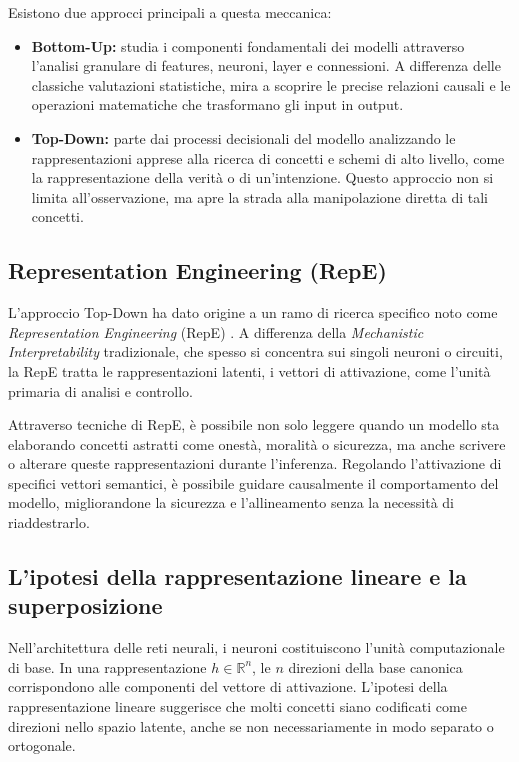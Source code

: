 Esistono due approcci principali a questa meccanica:
\begin{itemize}
    \item \textbf{Bottom-Up:} studia i componenti fondamentali dei modelli attraverso l'analisi granulare di features, neuroni, layer e connessioni. A differenza delle classiche valutazioni statistiche, mira a scoprire le precise relazioni causali e le operazioni matematiche che trasformano gli input in output.

    \item \textbf{Top-Down:} parte dai processi decisionali del modello analizzando le rappresentazioni apprese alla ricerca di concetti e schemi di alto livello, come la rappresentazione della verità o di un'intenzione. Questo approccio non si limita all'osservazione, ma apre la strada alla manipolazione diretta di tali concetti.
\end{itemize}

\subsection{Representation Engineering (RepE)}
L'approccio Top-Down ha dato origine a un ramo di ricerca specifico noto come \textit{Representation Engineering} (RepE) \cite{zou2025representationengineeringtopdownapproach}. A differenza della \textit{Mechanistic Interpretability} tradizionale, che spesso si concentra sui singoli neuroni o circuiti, la RepE tratta le rappresentazioni latenti, i vettori di attivazione, come l'unità primaria di analisi e controllo.

Attraverso tecniche di RepE, è possibile non solo leggere quando un modello sta elaborando concetti astratti come onestà, moralità o sicurezza, ma anche scrivere o alterare queste rappresentazioni durante l'inferenza. Regolando l'attivazione di specifici vettori semantici, è possibile guidare causalmente il comportamento del modello, migliorandone la sicurezza e l'allineamento senza la necessità di riaddestrarlo.

\subsection{L'ipotesi della rappresentazione lineare e la superposizione}
Nell'architettura delle reti neurali, i neuroni costituiscono l'unità computazionale di base. In una rappresentazione \(h \in \mathbb{R}^n\), le \(n\) direzioni della base canonica corrispondono alle componenti del vettore di attivazione. L'ipotesi della rappresentazione lineare suggerisce che molti concetti siano codificati come direzioni nello spazio latente, anche se non necessariamente in modo separato o ortogonale.

